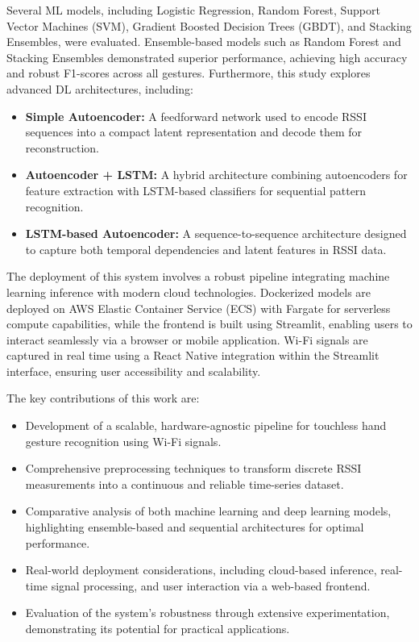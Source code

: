 \documentclass[10pt,twocolumn,letterpaper]{article}
\begin{document}
Several ML models, including Logistic Regression, Random Forest, Support Vector Machines (SVM), Gradient Boosted Decision Trees (GBDT), and Stacking Ensembles, were evaluated. Ensemble-based models such as Random Forest and Stacking Ensembles demonstrated superior performance, achieving high accuracy and robust F1-scores across all gestures. Furthermore, this study explores advanced DL architectures, including:
\begin{itemize}
    \item \textbf{Simple Autoencoder:} A feedforward network used to encode RSSI sequences into a compact latent representation and decode them for reconstruction.
    \item \textbf{Autoencoder + LSTM:} A hybrid architecture combining autoencoders for feature extraction with LSTM-based classifiers for sequential pattern recognition.
    \item \textbf{LSTM-based Autoencoder:} A sequence-to-sequence architecture designed to capture both temporal dependencies and latent features in RSSI data.
\end{itemize}

The deployment of this system involves a robust pipeline integrating machine learning inference with modern cloud technologies. Dockerized models are deployed on AWS Elastic Container Service (ECS) with Fargate for serverless compute capabilities, while the frontend is built using Streamlit, enabling users to interact seamlessly via a browser or mobile application. Wi-Fi signals are captured in real time using a React Native integration within the Streamlit interface, ensuring user accessibility and scalability.

The key contributions of this work are:
\begin{itemize}
    \item Development of a scalable, hardware-agnostic pipeline for touchless hand gesture recognition using Wi-Fi signals.
    \item Comprehensive preprocessing techniques to transform discrete RSSI measurements into a continuous and reliable time-series dataset.
    \item Comparative analysis of both machine learning and deep learning models, highlighting ensemble-based and sequential architectures for optimal performance.
    \item Real-world deployment considerations, including cloud-based inference, real-time signal processing, and user interaction via a web-based frontend.
    \item Evaluation of the system's robustness through extensive experimentation, demonstrating its potential for practical applications.
\end{itemize}
\end{document}
